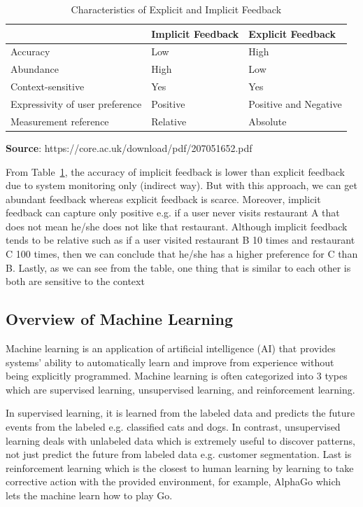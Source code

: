 \documentclass[12pt,oneside,openright,a4paper]{cpe-english-project}
\begin{document}
\begin{table}[H]
\caption{Characteristics of Explicit and Implicit Feedback}\label{tbl:2CharacteristicsofExplicitandImplicitFeedback}
\begin{tabularx}{\textwidth}{X|X|X} \hline\hline
& Implicit Feedback & Explicit Feedback \\ \hline\hline
Accuracy & Low & High \\ \hline
Abundance & High & Low \\ \hline
Context-sensitive & Yes & Yes \\ \hline
Expressivity of user preference & Positive & Positive and Negative \\ \hline
Measurement reference & Relative & Absolute \\ \hline\hline
\end{tabularx}\par
\smallskip
\textbf{Source}: https://core.ac.uk/download/pdf/207051652.pdf
\end{table}\vspace{-1em}


From Table~\ref{tbl:2CharacteristicsofExplicitandImplicitFeedback}, the accuracy of implicit feedback is lower than explicit feedback due to system monitoring only (indirect way). But with this approach, we can get abundant feedback whereas explicit feedback is scarce. Moreover, implicit feedback can capture only positive e.g. if a user never visits restaurant A that does not mean he/she does not like that restaurant. Although implicit feedback tends to be relative such as if a user visited restaurant B 10 times and restaurant C 100 times, then we can conclude that he/she has a higher preference for C than B. Lastly, as we can see from the table, one thing that is similar to each other is both are sensitive to the context

\subsection{Overview of Machine Learning}

Machine learning is an application of artificial intelligence (AI) that provides systems’ ability to automatically learn and improve from experience without being explicitly programmed. \cite{WhatisMachineLearning} Machine learning is often categorized into 3 types which are supervised learning, unsupervised learning, and reinforcement learning.

In supervised learning, it is learned from the labeled data and predicts the future events from the labeled e.g. classified cats and dogs. In contrast, unsupervised learning deals with unlabeled data which is extremely useful to discover patterns, not just predict the future from labeled data e.g. customer segmentation. Last is reinforcement learning which is the closest to human learning by learning to take corrective action with the provided environment, for example, AlphaGo which lets the machine learn how to play Go.
\end{document}
